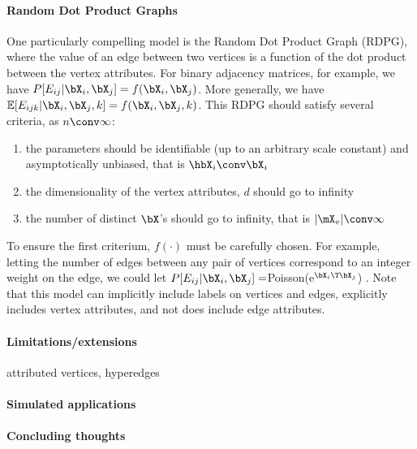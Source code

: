 \paragraph{Random Dot Product Graphs}

 One particularly compelling model is the Random Dot Product Graph (RDPG), where the value of an edge between two vertices is a function of the dot product between the vertex attributes.  For binary adjacency matrices, for example, we have $P[E_{ij} | \bX_i, \bX_j]=f(\bX_i, \bX_j)$.  More generally, we have $\mathbb{E}[E_{ijk} | \bX_i, \bX_j, k]= f(\bX_i, \bX_j, k)$.  This RDPG should satisfy several criteria, as $n \conv \infty$:

\begin{enumerate}
	\item the parameters should be identifiable (up to an arbitrary scale constant) and asymptotically unbiased, that is $\hbX_i \conv \bX_i$
	\item the dimensionality of the vertex attributes, $d$ should go to infinity
	\item the number of distinct $\bX$'s should go to infinity, that is $|\mX_v| \conv \infty$
\end{enumerate}

To ensure the first criterium, $f(\cdot)$ must be carefully chosen.  For example, letting the number of edges between any pair of vertices correspond to an integer weight on the edge, we could let $P[E_{ij} | \bX_i,\bX_j]=$Poisson(e$^{\bX_i\T \bX_j}$) \cite{}.   Note that this model can implicitly include labels on vertices and edges, explicitly includes vertex attributes, and not does include edge attributes.  



\paragraph{Limitations/extensions}

attributed vertices, hyperedges

\paragraph{Simulated applications}

\paragraph{Concluding thoughts}





